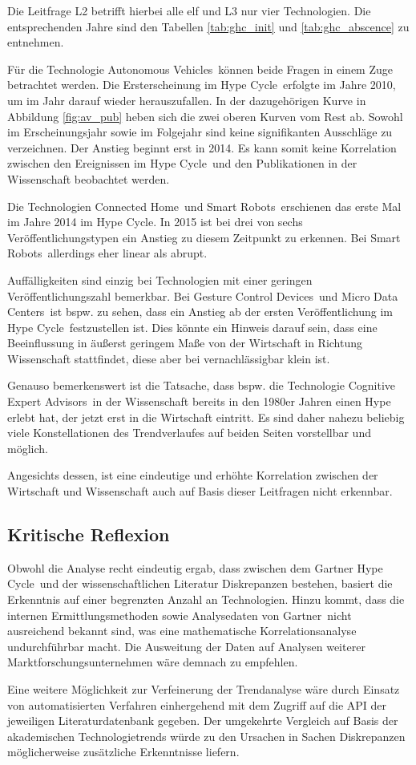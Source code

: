 Die Leitfrage L2 betrifft hierbei alle elf und L3 nur vier Technologien. Die entsprechenden Jahre sind den Tabellen \ref{tab:ghc_init} und \ref{tab:ghc_abscence} zu entnehmen.

Für die Technologie \glqq Autonomous Vehicles\grqq~können beide Fragen in einem Zuge betrachtet werden. Die Ersterscheinung im \glqq Hype Cycle\grqq~erfolgte im Jahre 2010, um im Jahr darauf wieder herauszufallen. In der dazugehörigen Kurve in Abbildung \ref{fig:av_pub} heben sich die zwei oberen Kurven vom Rest ab. Sowohl im Erscheinungsjahr sowie im Folgejahr sind keine signifikanten Ausschläge zu verzeichnen. Der Anstieg beginnt erst in 2014. Es kann somit keine Korrelation zwischen den Ereignissen im \glqq Hype Cycle\grqq~und den Publikationen in der Wissenschaft beobachtet werden.

Die Technologien \glqq Connected Home\grqq~und \glqq Smart Robots\grqq~erschienen das erste Mal im Jahre 2014 im \glqq Hype Cycle\grqq. In 2015 ist bei drei von sechs Veröffentlichungstypen ein Anstieg zu diesem Zeitpunkt zu erkennen. Bei \glqq Smart Robots\grqq~allerdings eher linear als abrupt.

Auffälligkeiten sind einzig bei Technologien mit einer geringen Veröffentlichungszahl bemerkbar. Bei \glqq Gesture Control Devices\grqq~und \glqq Micro Data Centers\grqq~ist bspw. zu sehen, dass ein Anstieg ab der ersten Veröffentlichung im \glqq Hype Cycle\grqq~festzustellen ist. Dies könnte ein Hinweis darauf sein, dass eine Beeinflussung in äußerst geringem Maße von der Wirtschaft in Richtung Wissenschaft stattfindet, diese aber bei vernachlässigbar klein ist.

Genauso bemerkenswert ist die Tatsache, dass bspw. die Technologie \glqq Cognitive Expert Advisors\grqq~in der Wissenschaft bereits in den 1980er Jahren einen Hype erlebt hat, der jetzt erst in die Wirtschaft eintritt. Es sind daher nahezu beliebig viele Konstellationen des Trendverlaufes auf beiden Seiten vorstellbar und möglich.

Angesichts dessen, ist eine eindeutige und erhöhte Korrelation zwischen der Wirtschaft und Wissenschaft auch auf Basis dieser Leitfragen nicht erkennbar.

\subsection{Kritische Reflexion}
Obwohl die Analyse recht eindeutig ergab, dass zwischen dem \glqq Gartner Hype Cycle\grqq~und der wissenschaftlichen Literatur Diskrepanzen bestehen, basiert die Erkenntnis auf einer begrenzten Anzahl an Technologien. Hinzu kommt, dass die internen Ermittlungsmethoden sowie Analysedaten von \glqq Gartner\grqq~nicht ausreichend bekannt sind, was eine mathematische Korrelationsanalyse undurchführbar macht. Die Ausweitung der Daten auf Analysen weiterer Marktforschungsunternehmen wäre demnach zu empfehlen.

Eine weitere Möglichkeit zur Verfeinerung der Trendanalyse wäre durch Einsatz von automatisierten Verfahren einhergehend mit dem Zugriff auf die \ac{API} der jeweiligen Literaturdatenbank gegeben. Der umgekehrte Vergleich auf Basis der akademischen Technologietrends würde zu den Ursachen in Sachen Diskrepanzen möglicherweise zusätzliche Erkenntnisse liefern.